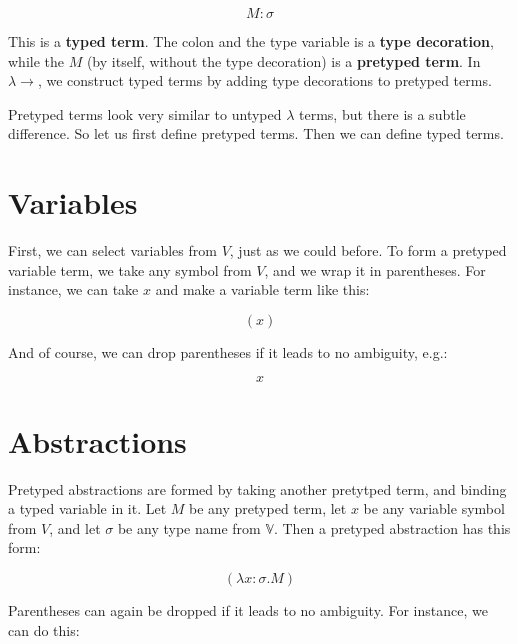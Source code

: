 \documentclass{book}
\numberwithin{equation}{chapter}
\newcommand{\vocab}{\textbf}
\begin{document}
\begin{equation}
M : \sigma
\end{equation}

\noindent
This is a \vocab{typed term}. The colon and the type variable is a \vocab{type decoration}, while the $M$ (by itself, without the type decoration) is a \vocab{pretyped term}. In $\lambda\rightarrow$, we construct typed terms by adding type decorations to pretyped terms.

Pretyped terms look very similar to untyped $\lambda$ terms, but there is a subtle difference. So let us first define pretyped terms. Then we can define typed terms.


\section{Variables}

First, we can select variables from $V$, just as we could before. To form a pretyped variable term, we take any symbol from $V$, and we wrap it in parentheses. For instance, we can take $x$ and make a variable term like this:

\begin{equation}
(x)
\end{equation}

\noindent
And of course, we can drop parentheses if it leads to no ambiguity, e.g.:

\begin{equation}
x
\end{equation}


\section{Abstractions}

Pretyped abstractions are formed by taking another pretytped term, and binding a typed variable in it. Let $M$ be any pretyped term, let $x$ be any variable symbol from $V$, and let $\sigma$ be any type name from $\mathbb{V}$. Then a pretyped abstraction has this form:

\begin{equation}
(\lambda x : \sigma.M)
\end{equation}

\noindent
Parentheses can again be dropped if it leads to no ambiguity. For instance, we can do this:
\end{document}
